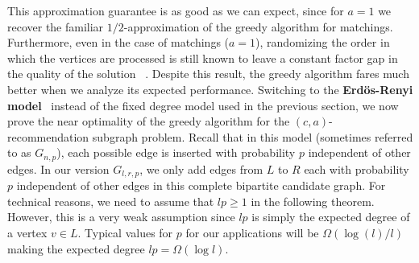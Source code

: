 This approximation guarantee is as good as we can expect,
since for $a=1$ we recover the familiar $1/2$-approximation
of the greedy algorithm for matchings. Furthermore, even in the case of matchings ($a=1$),
randomizing the order in which the vertices are processed is still
known to leave a constant factor gap in the quality of the solution
~\cite{KarpVaziraniVazirani1990}. Despite this result, the greedy
algorithm fares much better when we analyze its expected performance.
Switching to the
{\bf Erd\"{o}s-Renyi model}~\cite{ErdosRenyi59} instead of the fixed degree model used in
the previous section, we now prove the near optimality of the
greedy algorithm for the $(c, a)$-recommendation subgraph problem.
Recall that in this model (sometimes referred to as $G_{n,p}$), each possible edge is inserted with probability $p$ independent of other edges. In our version $G_{l,r,p}$, we only add edges from $L$ to $R$ each with probability $p$ independent of other edges in this complete bipartite candidate graph.  For technical reasons, we need to assume that $lp \geq 1$ in the following theorem. However, this is a very weak assumption since $lp$ is simply the expected degree of a vertex $v\in L$. Typical values for $p$ for our applications will be $\Omega(\log(l)/l)$ making the expected degree $lp=\Omega(\log l)$.

